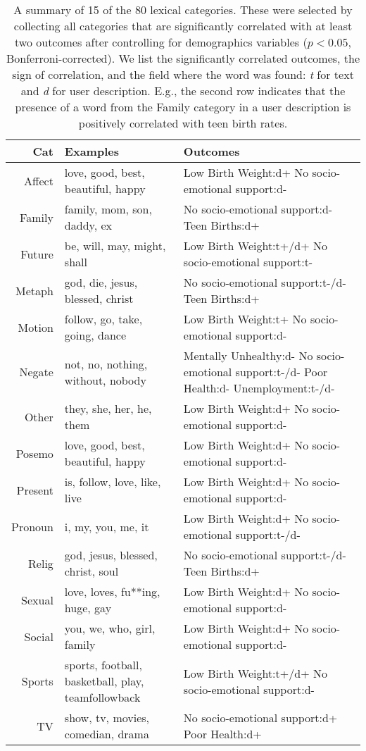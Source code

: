 \begin{table*}[t]
\centering
\begin{tabular}{|r|p{5cm}|p{11cm}|}
\hline
{\bf Cat}  &  {\bf Examples}  &  {\bf Outcomes}\\
\hline
Affect  &  love, good, best, beautiful, happy  &  Low Birth Weight:d+ No socio-emotional support:d- \\
\hline
Family  &  family, mom, son, daddy, ex  &  No socio-emotional support:d- Teen Births:d+ \\
\hline
Future  &  be, will, may, might, shall  &  Low Birth Weight:t+/d+ No socio-emotional support:t- \\
\hline
Metaph  &  god, die, jesus, blessed, christ  &  No socio-emotional support:t-/d- Teen Births:d+ \\
\hline
Motion  &  follow, go, take, going, dance  &  Low Birth Weight:t+ No socio-emotional support:d- \\
\hline
Negate  &  not, no, nothing, without, nobody  &  Mentally Unhealthy:d- No socio-emotional support:t-/d- Poor Health:d- Unemployment:t-/d- \\
\hline
Other  &  they, she, her, he, them  &  Low Birth Weight:d+ No socio-emotional support:d- \\
\hline
Posemo  &  love, good, best, beautiful, happy  &  Low Birth Weight:d+ No socio-emotional support:d- \\
\hline
Present  &  is, follow, love, like, live  &  Low Birth Weight:d+ No socio-emotional support:d- \\
\hline
Pronoun  &  i, my, you, me, it  &  Low Birth Weight:d+ No socio-emotional support:t-/d- \\
\hline
Relig  &  god, jesus, blessed, christ, soul  &  No socio-emotional support:t-/d- Teen Births:d+ \\
\hline
Sexual  &  love, loves, fu**ing, huge, gay  &  Low Birth Weight:d+ No socio-emotional support:d- \\
\hline
Social  &  you, we, who, girl, family  &  Low Birth Weight:d+ No socio-emotional support:d- \\
\hline
Sports  &  sports, football, basketball, play, teamfollowback  &  Low Birth Weight:t+/d+ No socio-emotional support:d- \\
\hline
TV  &  show, tv, movies, comedian, drama  &  No socio-emotional support:d+ Poor Health:d+ \\
\hline
\end{tabular}
\caption{A summary of 15 of the 80 lexical categories. These were selected by collecting all categories that are significantly correlated with at least two outcomes after controlling for demographics variables ($p < 0.05$, Bonferroni-corrected). We list the significantly correlated outcomes, the sign of correlation, and the field where the word was found: {\sl t} for text and {\sl d} for user description.  E.g., the second row indicates that the presence of a word from the Family category in a user description is positively correlated with teen birth rates. {\label{tab.lexicon2}}}
\end{table*}
